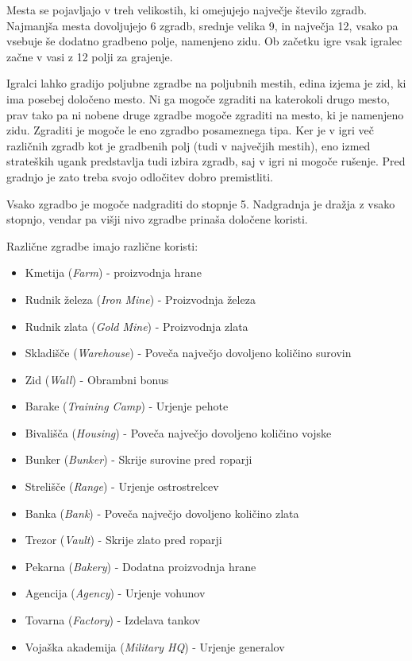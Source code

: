 \documentclass[a4paper, 16pt]{article}
\begin{document}
Mesta se pojavljajo v treh velikostih, ki omejujejo največje število zgradb. Najmanjša mesta dovoljujejo 6 zgradb, srednje velika 9, in največja 12, vsako pa vsebuje še dodatno gradbeno polje, namenjeno zidu.
Ob začetku igre vsak igralec začne v vasi z 12 polji za grajenje. 

Igralci lahko gradijo poljubne zgradbe na poljubnih mestih, edina izjema je zid, ki ima posebej določeno mesto. Ni ga mogoče zgraditi na katerokoli drugo mesto, prav tako pa ni nobene 
druge zgradbe mogoče zgraditi na mesto, ki je namenjeno zidu. Zgraditi je mogoče le eno zgradbo posameznega tipa. Ker je v igri več različnih zgradb kot je gradbenih polj (tudi v največjih mestih), 
eno izmed strateških ugank predstavlja tudi izbira zgradb, saj v igri ni mogoče rušenje. Pred gradnjo je zato treba svojo odločitev dobro premistliti.

Vsako zgradbo je mogoče nadgraditi do stopnje 5. Nadgradnja je dražja z vsako stopnjo, vendar pa višji nivo zgradbe prinaša določene koristi.

Različne zgradbe imajo različne koristi:
\begin{itemize}
    \item Kmetija (\textit{Farm}) - proizvodnja hrane 
    \item Rudnik železa (\textit{Iron Mine}) - Proizvodnja železa
    \item Rudnik zlata (\textit{Gold Mine}) - Proizvodnja zlata
    \item Skladišče (\textit{Warehouse}) - Poveča največjo dovoljeno količino surovin
    \item Zid (\textit{Wall}) - Obrambni bonus
    \item Barake (\textit{Training Camp}) - Urjenje pehote   
    \item Bivališča (\textit{Housing}) - Poveča največjo dovoljeno količino vojske
    \item Bunker (\textit{Bunker}) - Skrije surovine pred roparji
    \item Strelišče (\textit{Range}) - Urjenje ostrostrelcev
    \item Banka (\textit{Bank}) - Poveča največjo dovoljeno količino zlata
    \item Trezor (\textit{Vault}) - Skrije zlato pred roparji
    \item Pekarna (\textit{Bakery}) - Dodatna proizvodnja hrane
    \item Agencija (\textit{Agency}) - Urjenje vohunov
    \item Tovarna (\textit{Factory}) - Izdelava tankov
    \item Vojaška akademija (\textit{Military HQ}) - Urjenje generalov
\end{itemize}
\end{document}
